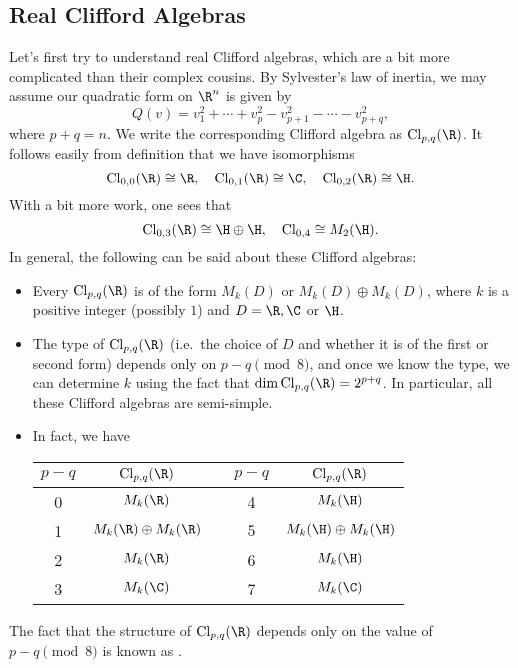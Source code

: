 \documentclass[a4paper]{article}
\newcommand\Cl{\mathrm{Cl}}
\begin{document}
\subsection{Real Clifford Algebras}
Let's first try to understand real Clifford algebras, which are a bit more complicated than their complex cousins. By Sylvester's law of inertia, we may assume our quadratic form on $\R^n$ is given by
\[
  Q(v) = v_1^2 + \cdots + v_p^2 - v_{p + 1}^2 - \cdots - v_{p + q}^2,
\]
where $p + q = n$. We write the corresponding Clifford algebra as $\Cl_{p, q}(\R)$. It follows easily from definition that we have isomorphisms
\[
  \Cl_{0, 0}(\R) \cong \R, \quad \Cl_{0, 1}(\R) \cong \C,\quad \Cl_{0, 2}(\R) \cong \H.
\]
With a bit more work, one sees that
\[
  \Cl_{0, 3}(\R) \cong \H \oplus \H,\quad \Cl_{0, 4} \cong M_2(\H).
\]
In general, the following can be said about these Clifford algebras:
\begin{itemize}
  \item Every $\Cl_{p, q}(\R)$ is of the form $M_k(D)$ or $M_k(D) \oplus M_k(D)$, where $k$ is a positive integer (possibly $1$) and $D = \R, \C$ or $\H$.
  \item The type of $\Cl_{p, q}(\R)$ (i.e.\ the choice of $D$ and whether it is of the first or second form) depends only on $p - q \pmod 8$, and once we know the type, we can determine $k$ using the fact that $\dim \Cl_{p, q}(\R) = 2^{p + q}$. In particular, all these Clifford algebras are semi-simple.
  \item In fact, we have
    \begin{center}
      \begin{tabular}{ccccc}
        \toprule
        $p - q$ & $\Cl_{p, q}(\R)$ &\hphantom{asd} & $p - q$ & $\Cl_{p, q}(\R)$\\
        \midrule
        0 & $M_k(\R)$ & & 4 & $M_k(\H)$ \\
        1 & $M_k(\R) \oplus M_k(\R)$ & & $5$ & $M_k(\H) \oplus M_k(\H)$\\
        2 & $M_k(\R)$ & & 6 & $M_k(\H)$\\
        3 & $M_k(\C)$ & & 7 & $M_k(\C)$\\
        \bottomrule
      \end{tabular}
    \end{center}
\end{itemize}
The fact that the structure of $\Cl_{p, q}(\R)$ depends only on the value of $p - q \pmod 8$ is known as .
\end{document}
